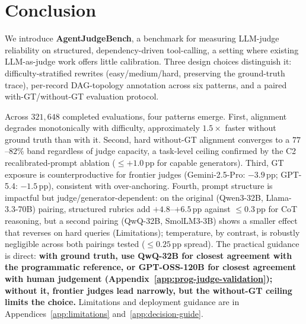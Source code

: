 \section{Conclusion}
\label{sec:conclusion}
We introduce \textbf{AgentJudgeBench}, a benchmark for measuring LLM-judge reliability on structured, dependency-driven tool-calling, a setting where existing LLM-as-judge work offers little calibration. Three design choices distinguish it: difficulty-stratified rewrites (easy/medium/hard, preserving the ground-truth trace), per-record DAG-topology annotation across six patterns, and a paired with-GT/without-GT evaluation protocol.

Across $321{,}648$ completed evaluations, four patterns emerge. First, alignment degrades monotonically with difficulty, approximately $1.5\times$ faster without ground truth than with it. Second, hard without-GT alignment converges to a $77$--$82\%$ band regardless of judge capacity, a task-level ceiling confirmed by the C2 recalibrated-prompt ablation (${\leq}{+1.0}$\,pp for capable generators). Third, GT exposure is counterproductive for frontier judges (Gemini-2.5-Pro: $-3.9$\,pp; GPT-5.4: $-1.5$\,pp), consistent with over-anchoring. Fourth, prompt structure is impactful but judge/generator-dependent: on the original (Qwen3-32B, Llama-3.3-70B) pairing, structured rubrics add $+4.8$--$+6.5$\,pp against ${\leq}0.3$\,pp for CoT reasoning, but a second pairing (QwQ-32B, SmolLM3-3B) shows a smaller effect that reverses on hard queries (Limitations); temperature, by contrast, is robustly negligible across both pairings tested (${\leq}0.25$\,pp spread). The practical guidance is direct: \textbf{with ground truth, use QwQ-32B for closest agreement with the programmatic reference, or GPT-OSS-120B for closest agreement with human judgement (Appendix~\ref{app:prog-judge-validation}); without it, frontier judges lead narrowly, but the without-GT ceiling limits the choice.} Limitations and deployment guidance are in Appendices~\ref{app:limitations} and~\ref{app:decision-guide}.